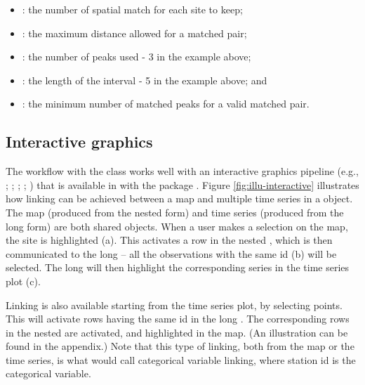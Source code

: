 \documentclass[
  shortnames]{jss}
\providecommand{\tightlist}{%
  \setlength{\itemsep}{0pt}\setlength{\parskip}{0pt}}
\begin{document}
\begin{itemize}
\tightlist
\item
  : the number of spatial match for each site to keep;
\item
  : the maximum distance allowed for a matched pair;
\item
  : the number of peaks used - 3 in the example above;
\item
  : the length of the interval - 5 in the example above; and
\item
  : the minimum number of matched peaks for a valid matched pair.
\end{itemize}

\hypertarget{interactive-graphics}{%
\subsection{Interactive graphics}\label{interactive-graphics}}

The workflow with the  class works well with an interactive graphics pipeline (e.g., \citet{buja1988elements}; \citet{buja1996interactive}; \citet{sutherland2000orca}; \citet{xie2014reactive}; \citet{cheng2016enabling}) that is available in  with the package  \citep{crosstalk}. Figure \ref{fig:illu-interactive} illustrates how linking can be achieved between a map and multiple time series in a  object. The map (produced from the nested form) and time series (produced from the long form) are both shared  objects. When a user makes a selection on the map, the site is highlighted (a). This activates a row in the nested , which is then communicated to the long  -- all the observations with the same id (b) will be selected. The long  will then highlight the corresponding series in the time series plot (c).

Linking is also available starting from the time series plot, by selecting points. This will activate rows having the same id in the long . The corresponding rows in the nested  are activated, and highlighted in the map. (An illustration can be found in the appendix.) Note that this type of linking, both from the map or the time series, is what \citet{CS07} would call categorical variable linking, where station id is the categorical variable.
\end{document}
